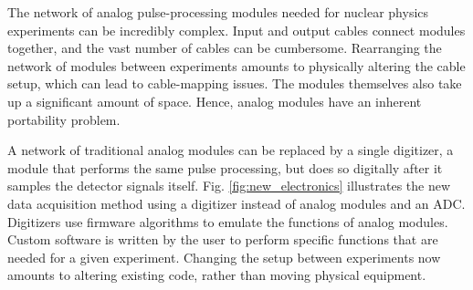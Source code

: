 The network of analog pulse-processing modules needed for nuclear physics experiments can be incredibly complex. Input and output cables connect modules together, and the vast number of cables can be cumbersome. Rearranging the network of modules between experiments amounts to physically altering the cable setup, which can lead to cable-mapping issues. The modules themselves also take up a significant amount of space. Hence, analog modules have an inherent portability problem.

A network of traditional analog modules can be replaced by a single digitizer, a module that performs the same pulse processing, but does so digitally after it samples the detector signals itself. Fig. \ref{fig:new_electronics} illustrates the new data acquisition method using a digitizer instead of analog modules and an ADC. Digitizers use firmware algorithms to emulate the functions of analog modules. Custom software is written by the user to perform specific functions that are needed for a given experiment. Changing the setup between experiments now amounts to altering existing code, rather than moving physical equipment. 

